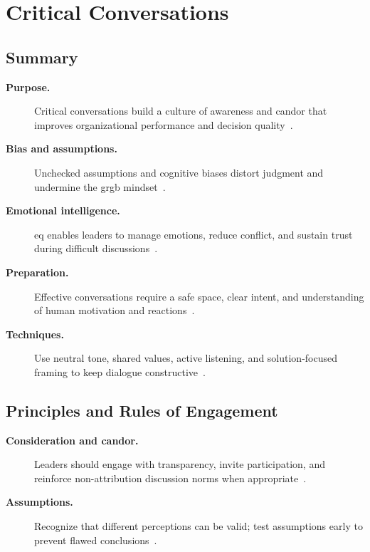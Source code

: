 \documentclass[../main.tex]{subfiles}
\begin{document}
\section{Critical Conversations}

\subsection{Summary}
\begin{description}
  \item[\textbf{Purpose.}] Critical conversations build a culture of awareness and candor that improves
  organizational performance and decision quality~\autocite{edo-5-2-9-critical-conversations-2025}.
  \item[\textbf{Bias and assumptions.}] Unchecked assumptions and cognitive biases distort judgment and
  undermine the \ac{grgb} mindset~\autocite{edo-5-2-9-critical-conversations-2025}.
  \item[\textbf{Emotional intelligence.}] \ac{eq} enables leaders to manage emotions, reduce conflict, and
  sustain trust during difficult discussions~\autocite{edo-5-2-9-critical-conversations-2025}.
  \item[\textbf{Preparation.}] Effective conversations require a safe space, clear intent, and understanding of
  human motivation and reactions~\autocite{edo-5-2-9-critical-conversations-2025}.
  \item[\textbf{Techniques.}] Use neutral tone, shared values, active listening, and solution-focused framing
  to keep dialogue constructive~\autocite{edo-5-2-9-critical-conversations-2025}.
\end{description}

\subsection{Principles and Rules of Engagement}
\begin{description}
  \item[\textbf{Consideration and candor.}] Leaders should engage with transparency, invite participation,
  and reinforce non-attribution discussion norms when appropriate~\autocite{edo-5-2-9-critical-conversations-2025}.
  \item[\textbf{Assumptions.}] Recognize that different perceptions can be valid; test assumptions early to
  prevent flawed conclusions~\autocite{edo-5-2-9-critical-conversations-2025}.
\end{description}
\end{document}

